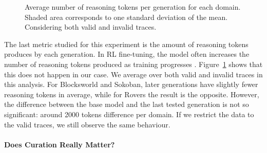 \begin{figure}[t]
\centering
\begin{minipage}[t]{0.48\textwidth}
    \centering
    \scalebox{0.75}{}
    \caption{Performance across generations for Rovers. The $y$-axis represents
      the plan length of the plans found by each generation, while the $x$-axis
      shows the cumulative number of solved instances sorted by plan length.}
    \label{fig:rovers}
\end{minipage}
\hfill
\begin{minipage}[t]{0.48\textwidth}
    \centering
    \scalebox{0.575}{}
    \caption{Average number of reasoning tokens per generation for each
      domain. Shaded area corresponds to one standard deviation of the
      mean. Considering both valid and invalid traces.}
    \label{fig:tokens}
\end{minipage}
\end{figure}


The last metric studied for this experiment is the amount of reasoning tokens
produces by each generation. In RL fine-tuning, the model often increases the
number of reasoning tokens produced as training progresses
\citep{deepseek-arxiv2025}. Figure~\ref{fig:tokens} shows that this does not happen
in our case. We average over both valid and invalid traces in this analysis. For
Blocksworld and Sokoban, later generations have slightly fewer reasoning tokens
in average, while for Rovers the result is the opposite. However, the difference
between the base model and the last tested generation is not so significant:
around 2000 tokens difference per domain. If we restrict the data to the valid
traces, we still observe the same behaviour.


\paragraph{Does Curation Really Matter?}

